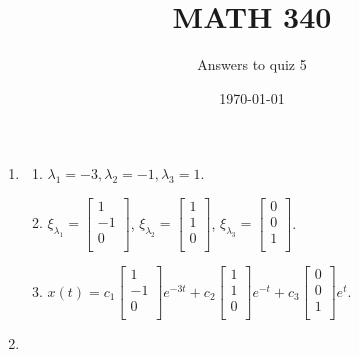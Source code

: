 \documentclass{article}
\begin{document}
\title{MATH 340}
\author{Answers to quiz 5}
\date{\today}
\maketitle

\begin{enumerate}

\item

\begin{enumerate}
	\item $\lambda_1=-3,\lambda_2=-1,\lambda_3=1$.
	\item $\xi_{\lambda_1}=\begin{bmatrix} 1\\ -1\\ 0\\ \end{bmatrix}$, $\xi_{\lambda_2}=\begin{bmatrix} 1\\ 1\\ 0\\ \end{bmatrix}$, $\xi_{\lambda_3}=\begin{bmatrix} 0\\ 0\\ 1\\ \end{bmatrix}$.
	\item $x(t)=c_1\begin{bmatrix} 1\\-1\\0\\ \end{bmatrix}e^{-3t}+c_2\begin{bmatrix}1\\1\\0\\\end{bmatrix}e^{-t}+c_3\begin{bmatrix}0\\0\\1\\ \end{bmatrix}e^{t}$.
\end{enumerate}

\item


\end{enumerate}
\end{document}
